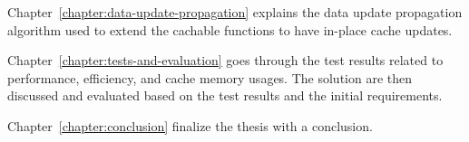 Chapter~\ref{chapter:data-update-propagation} explains the data update propagation algorithm used to extend the cachable functions to have in-place cache updates.

Chapter~\ref{chapter:tests-and-evaluation} goes through the test results related to performance, efficiency, and cache memory usages. The solution are then discussed and evaluated based on the test results and the initial requirements.

Chapter~\ref{chapter:conclusion} finalize the thesis with a conclusion.





